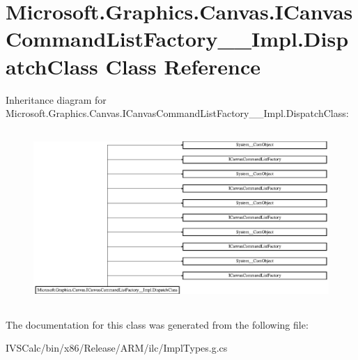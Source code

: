 \hypertarget{class_microsoft_1_1_graphics_1_1_canvas_1_1_i_canvas_command_list_factory_____impl_1_1_dispatch_class}{}\section{Microsoft.\+Graphics.\+Canvas.\+I\+Canvas\+Command\+List\+Factory\+\_\+\+\_\+\+Impl.\+Dispatch\+Class Class Reference}
\label{class_microsoft_1_1_graphics_1_1_canvas_1_1_i_canvas_command_list_factory_____impl_1_1_dispatch_class}
Inheritance diagram for Microsoft.\+Graphics.\+Canvas.\+I\+Canvas\+Command\+List\+Factory\+\_\+\+\_\+\+Impl.\+Dispatch\+Class\+:\begin{figure}[H]
\begin{center}
\leavevmode
\includegraphics[height=6.652268cm]{class_microsoft_1_1_graphics_1_1_canvas_1_1_i_canvas_command_list_factory_____impl_1_1_dispatch_class}
\end{center}
\end{figure}


The documentation for this class was generated from the following file\+:\begin{DoxyCompactItemize}
\item 
I\+V\+S\+Calc/bin/x86/\+Release/\+A\+R\+M/ilc/Impl\+Types.\+g.\+cs\end{DoxyCompactItemize}
